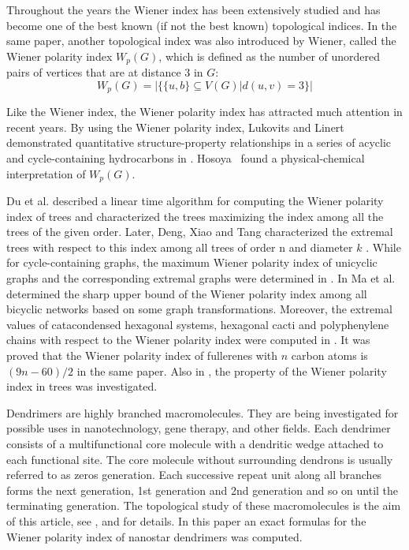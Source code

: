 \documentclass[12pt]{article}
\theoremstyle{theorem}
\theoremstyle{defi}
\begin{document}
Throughout the years the Wiener index has been extensively studied and has become one of the best known (if not the best known) topological indices. In the same paper, another topological index was also introduced by Wiener, called the Wiener polarity index $W_p(G)$, which is defined as the number of unordered pairs of vertices that are at distance $3$ in $G$:
$$
W_p(G) = |\{\{u,b\}\subseteq V(G)| d(u,v) = 3\}|
$$

 Like the Wiener index, the Wiener polarity index has attracted much attention in recent years. By using the Wiener polarity index, Lukovits and Linert demonstrated quantitative structure-property relationships in a series of acyclic and cycle-containing hydrocarbons in \cite{10}. Hosoya~\cite{11} found a physical-chemical interpretation of $W_p(G)$. 

Du et al. \cite{12} described a linear time algorithm for computing the Wiener polarity index of trees and characterized the trees maximizing the index among all the trees of the given order. Later, Deng, Xiao and Tang characterized the extremal trees with respect to this index among all trees of order n and diameter $k$ \cite{13}. While for cycle-containing graphs, the maximum Wiener polarity index of unicyclic graphs and the corresponding extremal graphs were determined in \cite{14}. In \cite{15} Ma et al. determined the sharp upper bound of the Wiener polarity index among all bicyclic networks based on some graph transformations. Moreover, the extremal values of catacondensed hexagonal systems, hexagonal cacti and polyphenylene chains with respect to the Wiener polarity index were computed in \cite{16}. It was proved that the Wiener polarity index of fullerenes with $n$ carbon atoms is $(9n-60)/2$ in the same paper. Also in \cite{17}, the property of the Wiener polarity index in trees was investigated.
  
Dendrimers are highly branched macromolecules. They are being investigated for possible uses in nanotechnology, gene therapy, and other fields. Each dendrimer consists of a multifunctional core molecule with a dendritic wedge attached to each functional site. The core molecule without surrounding dendrons is usually referred to as zeros generation. Each successive repeat unit along all branches forms the next generation, 1st generation and 2nd generation and so on until the terminating generation. The topological study of these macromolecules is the aim of this article, see \cite{18}, \cite{19} and \cite{20}  for details. 
   In this paper an exact formulas for the Wiener polarity index of nanostar dendrimers was computed.
\end{document}
